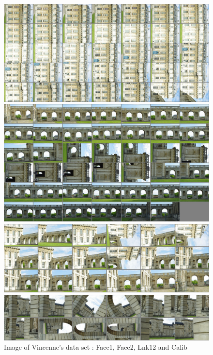 \begin{figure}
\begin{center}
\includegraphics[width=120mm]{FIGS/Vincennes/Planche-F1.jpg}

\vspace{0.3cm}
\includegraphics[width=120mm]{FIGS/Vincennes/Planche-F2.jpg}

\vspace{0.3cm}
\includegraphics[width=120mm]{FIGS/Vincennes/Planche-Lnk.jpg}

\vspace{0.3cm}
\includegraphics[width=120mm]{FIGS/Vincennes/Planche-Calib.jpg}
\end{center}
\caption{Image of Vincenne's data set : Face1, Face2, Lnk12 and Calib }
\label{FIG:Glob:Vincenne}
\end{figure}




